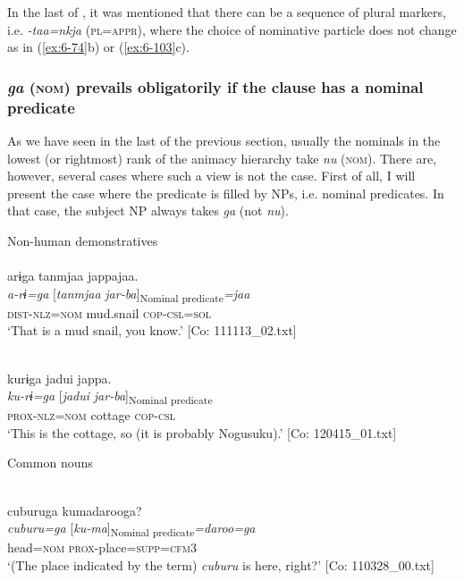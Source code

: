 \begin{table}
  In the last of , it was mentioned that there can be a sequence of plural markers, i.e. \textit{-taa=nkja} (\textsc{pl}=\textsc{appr}), where the choice of nominative particle does not change as in (\ref{ex:6-74}b) or (\ref{ex:6-103}c).

\subsubsection{\textit{ga} (\textsc{nom}) prevails obligatorily if the clause has a nominal predicate}

As we have seen in the last of the previous section, usually the nominals in the lowest (or rightmost) rank of the animacy hierarchy take \textit{nu} (\textsc{nom}). There are, however, several cases where such a view is not the case. First of all, I will present the case where the predicate is filled by NPs, i.e. nominal predicates. In that case, the subject NP always takes \textit{ga} (not \textit{nu}).

\ea\label{ex:6-119}
 Non-human demonstratives\\

 \ea{}\\
{\TM}
\glll  arɨga  tanmjaa  jappajaa.\\
\textit{a-rɨ=ga}  [\textit{tanmjaa}  \textit{jar-ba}]\textsubscript{Nominal predicate}\textit{=jaa}\\
\textsc{dist}-\textsc{nlz}=\textsc{nom}  mud.snail  \textsc{cop}-\textsc{csl}=\textsc{sol}\\
\glt ‘That is a mud snail, you know.’ [Co: 111113\_02.txt]
\z

\ex{}\\
{\TM}
\glll  kurɨga  jadui  jappa.\\
\textit{ku-rɨ=ga}  [\textit{jadui}  \textit{jar-ba}]\textsubscript{Nominal predicate}\\
\textsc{prox}-\textsc{nlz}=\textsc{nom}  cottage  \textsc{cop}-\textsc{csl}\\
\glt ‘This is the cottage, so (it is probably Nogusuku).’ [Co: 120415\_01.txt]
\z

  Common nouns

\ex{}\\
{\TM}
\glll  cuburuga  kumadarooga?\\
\textit{cuburu=ga}  [\textit{ku-ma}]\textsubscript{Nominal predicate}\textit{=daroo=ga}\\
head=\textsc{nom}  \textsc{prox}-place=\textsc{supp}=\textsc{cfm}3\\
\glt ‘(The place indicated by the term) \textit{cuburu} is here, right?’ [Co: 110328\_00.txt]
\z


\end{table}
